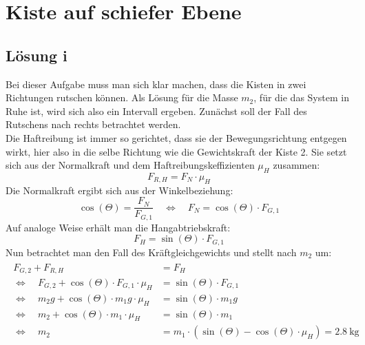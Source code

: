 \section{Kiste auf schiefer Ebene}
\subsection{Lösung i}
  Bei dieser Aufgabe muss man sich klar machen, dass die Kisten in zwei Richtungen rutschen können. Als Lösung
  für die Masse $m_2$, für die das System in Ruhe ist, wird sich also ein Intervall ergeben.
  Zunächst soll der Fall des Rutschens nach rechts betrachtet werden. \\
  Die Haftreibung ist immer so gerichtet, dass
  sie der Bewegungsrichtung entgegen wirkt, hier also in die selbe Richtung wie die Gewichtskraft der Kiste 2. Sie setzt
  sich aus der Normalkraft und dem Haftreibungskeffizienten $\mu_H$ zusammen:
  \begin{equation}
    F_{R,H} = F_N \cdot \mu_H
  \end{equation}
  Die Normalkraft ergibt sich aus der Winkelbeziehung:
  \begin{equation}
    \cos\left(\Theta\right) = \frac{F_N}{F_{G,1}}\quad \Leftrightarrow\quad F_N = \cos\left(\Theta\right) \cdot F_{G,1}
  \end{equation}
  Auf analoge Weise erhält man die Hangabtriebskraft:
  \begin{equation}
     F_H = \sin\left(\Theta\right) \cdot F_{G,1}
  \end{equation}
  Nun betrachtet man den Fall des Kräftgleichgewichts und stellt nach $m_2$ um:
  \begin{align}
    \begin{aligned}
      F_{G,2} + F_{R,H} &= F_H\\
    \Leftrightarrow \quad  F_{G,2} + \cos\left(\Theta\right) \cdot F_{G,1} \cdot \mu_H &= \sin\left(\Theta\right) \cdot F_{G,1} \\
    \Leftrightarrow \quad m_2 g + \cos\left(\Theta\right) \cdot m_1 g \cdot \mu_H &= \sin\left(\Theta\right) \cdot m_1 g \\
    \Leftrightarrow \quad m_2  + \cos\left(\Theta\right) \cdot m_1  \cdot \mu_H &= \sin\left(\Theta\right) \cdot m_1  \\
    \Leftrightarrow \quad m_2 &= m_1 \cdot (\sin\left(\Theta\right) - \cos\left(\Theta\right)  \cdot \mu_H) = \SI{2.8}{\kilo\gram}
  \end{aligned}
  \label{eq: m_2}
  \end{align}
